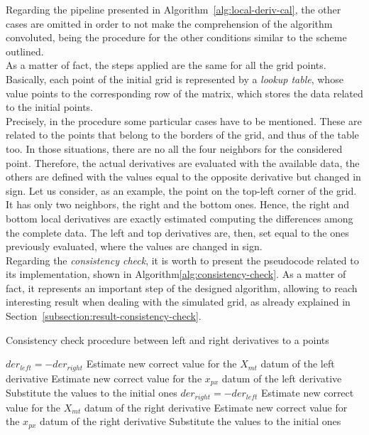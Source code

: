 Regarding the pipeline presented in Algorithm~\ref{alg:local-deriv-cal}, the other cases are omitted in order to not make the comprehension of the algorithm convoluted, being the procedure for the other conditions similar to the scheme outlined.\\
As a matter of fact, the steps applied are the same for all the grid points.
Basically, each point of the initial grid is represented by a \textit{lookup table}, whose value points to the corresponding row of the matrix, which stores the data related to the initial points.\\
Precisely, in the procedure some particular cases have to be mentioned.
These are related to the points that belong to the borders of the grid, and thus of the table too.
In those situations, there are no all the four neighbors for the considered point.
Therefore, the actual derivatives are evaluated with the available data, the others are defined with the values equal to the opposite derivative but changed in sign. 
Let us consider, as an example, the point on the top-left corner of the grid. 
It has only two neighbors, the right and the bottom ones. 
Hence, the right and bottom local derivatives are exactly estimated computing the differences among the complete data. 
The left and top derivatives are, then, set equal to the ones previously evaluated, where the values are changed in sign.\\
Regarding the \textit{consistency check}, it is worth to present the pseudocode related to its implementation, shown in Algorithm\ref{alg:consistency-check}.
As a matter of fact, it represents an important step of the designed algorithm, allowing to reach interesting result when dealing with the simulated grid, as already explained in Section~\ref{subsection:result-consistency-check}.

\begin{algorithm}
	\label{alg:consistency-check}
	\caption{Consistency check procedure between left and right derivatives to a points}
	\begin{algorithmic}[1]
				\State $der_{left} = -der_{right}$
			\Else
				\State Estimate new correct value for the $X_{mt}$ datum of the left derivative
				\State Estimate new correct value for the $x_{px}$ datum of the left derivative
				\State Substitute the values to the initial ones
			\EndIf		
		\EndIf
				\State $der_{right} = -der_{left}$
			\Else
				\State Estimate new correct value for the $X_{mt}$ datum of the right derivative
				\State Estimate new correct value for the $x_{px}$ datum of the right derivative
				\State Substitute the values to the initial ones
			\EndIf
		\EndIf
	\end{algorithmic} 
\end{algorithm} 

